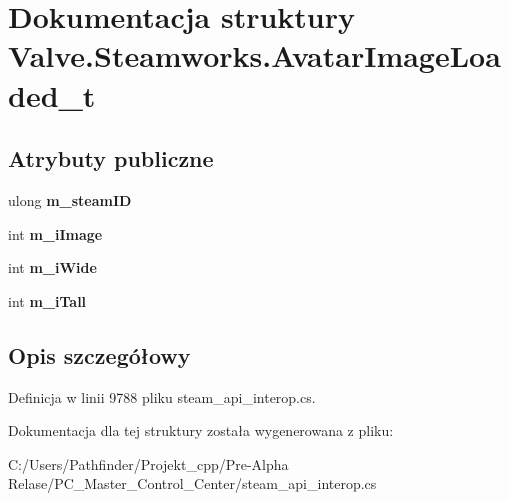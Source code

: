 \hypertarget{struct_valve_1_1_steamworks_1_1_avatar_image_loaded__t}{}\section{Dokumentacja struktury Valve.\+Steamworks.\+Avatar\+Image\+Loaded\+\_\+t}
\label{struct_valve_1_1_steamworks_1_1_avatar_image_loaded__t}
\subsection*{Atrybuty publiczne}
\begin{DoxyCompactItemize}
\item 
\mbox{\label{struct_valve_1_1_steamworks_1_1_avatar_image_loaded__t_a1db737cb28d01d1f6a19c02542bbabd5}} 
ulong {\bfseries m\+\_\+steam\+ID}
\item 
\mbox{\label{struct_valve_1_1_steamworks_1_1_avatar_image_loaded__t_aa67657219c0ee545e6fdb7af5f8e8722}} 
int {\bfseries m\+\_\+i\+Image}
\item 
\mbox{\label{struct_valve_1_1_steamworks_1_1_avatar_image_loaded__t_a1ae4a8748e9ed02ec2ac78c301c0c1c2}} 
int {\bfseries m\+\_\+i\+Wide}
\item 
\mbox{\label{struct_valve_1_1_steamworks_1_1_avatar_image_loaded__t_a10f1b70b37b8f30399788aec134637e2}} 
int {\bfseries m\+\_\+i\+Tall}
\end{DoxyCompactItemize}


\subsection{Opis szczegółowy}


Definicja w linii 9788 pliku steam\+\_\+api\+\_\+interop.\+cs.



Dokumentacja dla tej struktury została wygenerowana z pliku\+:\begin{DoxyCompactItemize}
\item 
C\+:/\+Users/\+Pathfinder/\+Projekt\+\_\+cpp/\+Pre-\/\+Alpha Relase/\+P\+C\+\_\+\+Master\+\_\+\+Control\+\_\+\+Center/steam\+\_\+api\+\_\+interop.\+cs\end{DoxyCompactItemize}
